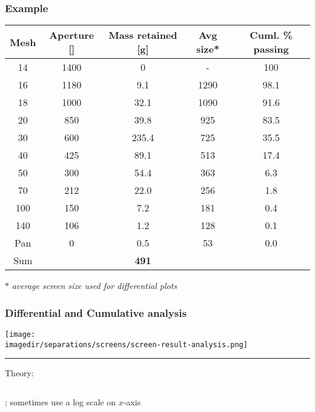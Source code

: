 
\begin{frame}\frametitle{Example}
	\begin{tabular}{ccc|c|c}
		Mesh&Aperture [\micron]	& Mass retained [g]	& Avg size* & {\scriptsize Cuml. \% passing} \\ \hline
		14	& 1400		& 0		& -      &  100           \\
		16	& 1180		& 9.1	& 1290   &  98.1          \\
		18	& 1000		& 32.1	& 1090   &  91.6          \\
		20	& 850		& 39.8	& 925    &  83.5          \\
		30	& 600		& 235.4	& 725    &  35.5          \\
		40	& 425		& 89.1	& 513    &  17.4          \\
		50	& 300		& 54.4	& 363    &  6.3           \\
		70	& 212		& 22.0	& 256    &  1.8           \\
		100	& 150		& 7.2	& 181    &  0.4           \\
		140	& 106		& 1.2	& 128    &  0.1           \\
		Pan	& 0			& 0.5	& 53     &  0.0           \\ \hline 
		Sum	&  			& \textbf{491}   &     			  \\ \hline
	\end{tabular}
	
	\vspace{12pt}
	$\ast$ \emph{\scriptsize average screen size used for differential plots}
\end{frame}
 
\begin{frame}\frametitle{Differential and Cumulative analysis}
	\begin{center}
		\texttt{[image: \\imagedir/separations/screens/screen-result-analysis.png]}
	\end{center}
	\hrule
	\vspace{6pt}
	Theory:
	\begin{columns}[t]
			{\color{myBlue}{\[f(x) = \displaystyle\frac{dF(x)}{dx}\]}}
			{\color{myGreen}{\[F(x) = \text{percent passing curve}\]}}
	\end{columns}
	\vspace{18pt}
	; sometimes use a log scale on $x$-axis
\end{frame}

